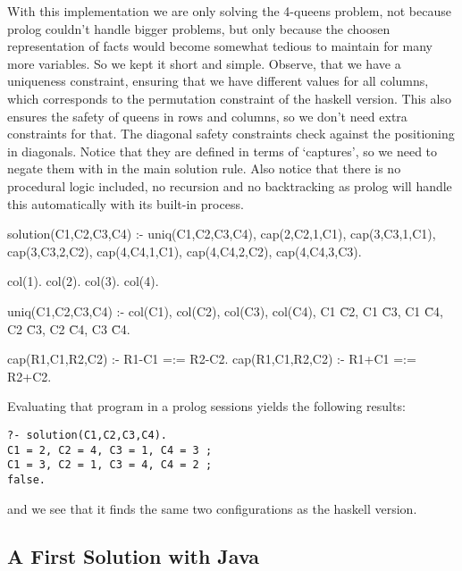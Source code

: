\begin{impl}
With this implementation we are only solving the 4-queens problem, not because prolog couldn't handle bigger problems, but only because the choosen representation of facts would become somewhat tedious to maintain for many more variables.
So we kept it short and simple.
Observe, that we have a uniqueness constraint, ensuring that we have different values for all columns, which corresponds to the permutation constraint of the haskell version.
This also ensures the safety of queens in rows and columns, so we don't need extra constraints for that.
The diagonal safety constraints check against the positioning in diagonals.
Notice that they are defined in terms of `captures', so we need to negate them with {\texttt{\+}} in the main solution rule.
Also notice that there is no procedural logic included, no recursion and no backtracking as prolog will handle this automatically with its built-in process.
\end{impl}

\begin{prologcode}
solution(C1,C2,C3,C4) :-
  uniq(C1,C2,C3,C4),
  \+ cap(2,C2,1,C1),
  \+ cap(3,C3,1,C1), \+ cap(3,C3,2,C2),
  \+ cap(4,C4,1,C1), \+ cap(4,C4,2,C2), \+ cap(4,C4,3,C3).

col(1). col(2). col(3). col(4).

uniq(C1,C2,C3,C4) :- col(C1), col(C2), col(C3), col(C4),
    C1 \= C2, C1 \= C3, C1 \= C4, C2 \= C3, C2 \= C4, C3 \= C4.

cap(R1,C1,R2,C2) :- R1-C1 =:= R2-C2.    %
cap(R1,C1,R2,C2) :- R1+C1 =:= R2+C2.    %
\end{prologcode}

Evaluating that program in a prolog sessions yields the following results:
\begin{verbatim}
?- solution(C1,C2,C3,C4).
C1 = 2, C2 = 4, C3 = 1, C4 = 3 ;
C1 = 3, C2 = 1, C3 = 4, C4 = 2 ;
false.
\end{verbatim}
and we see that it finds the same two configurations as the haskell version.

\subsection{A First Solution with Java}

